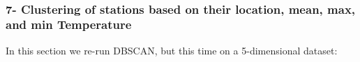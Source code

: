 \documentclass[11pt]{article}
\begin{document}
    \begin{center}
    \end{center}
    { \hspace*{\fill} \\}
    
    \hypertarget{clustering-of-stations-based-on-their-location-mean-max-and-min-temperature}{%
\subsubsection{7- Clustering of stations based on their location, mean,
max, and min
Temperature}\label{clustering-of-stations-based-on-their-location-mean-max-and-min-temperature}}

In this section we re-run DBSCAN, but this time on a 5-dimensional
dataset:
\end{document}
